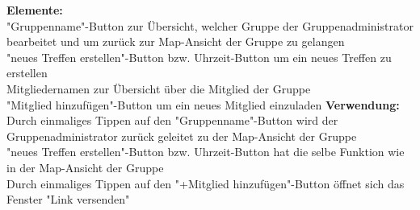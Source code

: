 \textbf{Elemente:}\\
"Gruppenname"-Button zur Übersicht, welcher Gruppe der Gruppenadministrator bearbeitet und um zurück zur Map-Ansicht der Gruppe zu gelangen\\
"neues Treffen erstellen"-Button bzw. Uhrzeit-Button um ein neues Treffen zu erstellen\\
Mitgliedernamen zur Übersicht über die Mitglied der Gruppe\\
"Mitglied hinzufügen"-Button um ein neues Mitglied einzuladen
\textbf{Verwendung:}\\
Durch einmaliges Tippen auf den "Gruppenname"-Button wird der Gruppenadministrator zurück geleitet zu der Map-Ansicht der Gruppe\\
"neues Treffen erstellen"-Button bzw. Uhrzeit-Button hat die selbe Funktion wie in der Map-Ansicht der Gruppe\\
Durch einmaliges Tippen auf den "+Mitglied hinzufügen"-Button öffnet sich das Fenster "Link versenden"\\ \\

